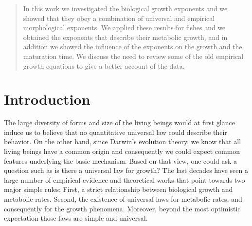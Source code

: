 
\date{Received: date / Accepted: date}

\maketitle

\begin{abstract}
In this work we investigated the biological growth exponents and we showed that they obey a combination of universal and empirical morphological exponents.  We applied these results for fishes and we obtained the exponents that describe their metabolic growth, and in addition we showed the influence of the exponents on the growth and the maturation time. We discuss the need to review some of the old empirical growth equations to give a better account of the data.
\end{abstract}

\section{Introduction}
\label{intro}
The large diversity of forms and size of the living beings would at first glance induce us to believe that  no quantitative universal law could describe their behavior.  On the other  hand, since Darwin's evolution theory, we know that all living beings have a common origin and consequently we could expect common features underlying the basic mechanism. Based on that view, one could ask a question such as is there a universal law for growth? The last decades have seen a large number of  empirical evidence  and theoretical works that point towards two major simple rules:  First, a strict relationship between biological growth and  metabolic rates. Second, the existence of universal laws for metabolic rates, and consequently for the growth phenomena. Moreover, beyond the most optimistic expectation those laws are simple and universal.

